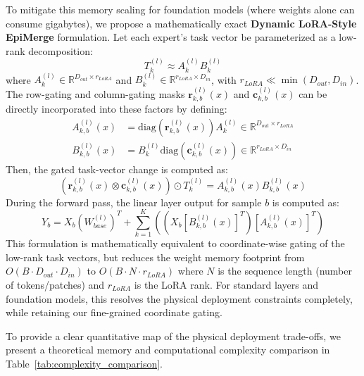 To mitigate this memory scaling for foundation models (where weights alone can consume gigabytes), we propose a mathematically exact \textbf{Dynamic LoRA-Style EpiMerge} formulation. Let each expert's task vector be parameterized as a low-rank decomposition:
\begin{equation}
    T_k^{(l)} \approx A_k^{(l)} B_k^{(l)}
\end{equation}
where $A_k^{(l)} \in \mathbb{R}^{D_{out} \times r_{LoRA}}$ and $B_k^{(l)} \in \mathbb{R}^{r_{LoRA} \times D_{in}}$, with $r_{LoRA} \ll \min(D_{out}, D_{in})$. 
The row-gating and column-gating masks $\mathbf{r}_{k, b}^{(l)}(x)$ and $\mathbf{c}_{k, b}^{(l)}(x)$ can be directly incorporated into these factors by defining:
\begin{align}
    A_{k, b}^{(l)}(x) &= \text{diag}\left( \mathbf{r}_{k, b}^{(l)}(x) \right) A_k^{(l)} \in \mathbb{R}^{D_{out} \times r_{LoRA}} \\
    B_{k, b}^{(l)}(x) &= B_k^{(l)} \text{diag}\left( \mathbf{c}_{k, b}^{(l)}(x) \right) \in \mathbb{R}^{r_{LoRA} \times D_{in}}
\end{align}
Then, the gated task-vector change is computed as:
\begin{equation}
    \left( \mathbf{r}_{k, b}^{(l)}(x) \otimes \mathbf{c}_{k, b}^{(l)}(x) \right) \odot T_k^{(l)} = A_{k, b}^{(l)}(x) B_{k, b}^{(l)}(x)
\end{equation}
During the forward pass, the linear layer output for sample $b$ is computed as:
\begin{equation}
    Y_b = X_b \left( W_{base}^{(l)} \right)^T + \sum_{k=1}^K \left( \left( X_b \left[ B_{k, b}^{(l)}(x) \right]^T \right) \left[ A_{k, b}^{(l)}(x) \right]^T \right)
\end{equation}
This formulation is mathematically equivalent to coordinate-wise gating of the low-rank task vectors, but reduces the weight memory footprint from $O(B \cdot D_{out} \cdot D_{in})$ to $O(B \cdot N \cdot r_{LoRA})$ where $N$ is the sequence length (number of tokens/patches) and $r_{LoRA}$ is the LoRA rank. For standard layers and foundation models, this resolves the physical deployment constraints completely, while retaining our fine-grained coordinate gating.

To provide a clear quantitative map of the physical deployment trade-offs, we present a theoretical memory and computational complexity comparison in Table~\ref{tab:complexity_comparison}.

